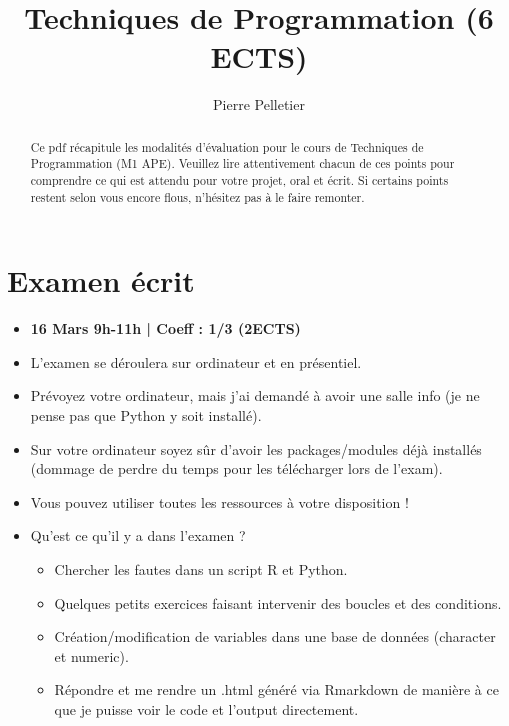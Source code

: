 \documentclass[
]{article}
\title{Techniques de Programmation (6 ECTS)}
\author{Pierre Pelletier}
\date{}
\providecommand{\tightlist}{%
  \setlength{\itemsep}{0pt}\setlength{\parskip}{0pt}}
\begin{document}
\maketitle
\begin{abstract}
Ce pdf récapitule les modalités d'évaluation pour le cours de Techniques
de Programmation (M1 APE). Veuillez lire attentivement chacun de ces
points pour comprendre ce qui est attendu pour votre projet, oral et
écrit. Si certains points restent selon vous encore flous, n'hésitez pas
à le faire remonter.
\end{abstract}

{
\setcounter{tocdepth}{2}
\tableofcontents
}
\newpage

\hypertarget{examen-uxe9crit}{%
\section{Examen écrit}\label{examen-uxe9crit}}

\begin{itemize}
\item
  \textbf{16 Mars 9h-11h | Coeff : 1/3 (2ECTS)}
\item
  L'examen se déroulera sur ordinateur et en présentiel.
\item
  Prévoyez votre ordinateur, mais j'ai demandé à avoir une salle info
  (je ne pense pas que Python y soit installé).
\item
  Sur votre ordinateur soyez sûr d'avoir les packages/modules déjà
  installés (dommage de perdre du temps pour les télécharger lors de
  l'exam).
\item
  Vous pouvez utiliser toutes les ressources à votre disposition !
\item
  Qu'est ce qu'il y a dans l'examen ?

  \begin{itemize}
  \tightlist
  \item
    Chercher les fautes dans un script R et Python.
  \item
    Quelques petits exercices faisant intervenir des boucles et des
    conditions.
  \item
    Création/modification de variables dans une base de données
    (character et numeric).
  \item
    Répondre et me rendre un .html généré via Rmarkdown de manière à ce
    que je puisse voir le code et l'output directement.
  \end{itemize}
\end{itemize}
\end{document}
